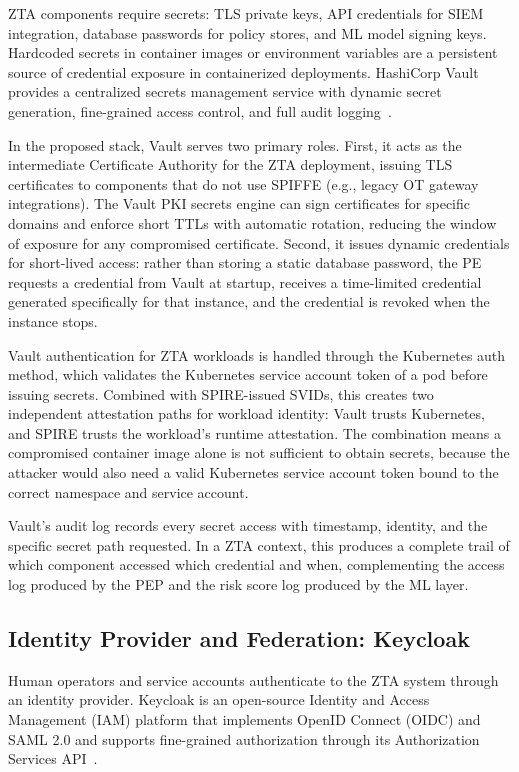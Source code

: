 \documentclass[conference]{IEEEtran}
\begin{document}
ZTA components require secrets: TLS private keys, API credentials for SIEM integration, database passwords for policy stores, and ML model signing keys. Hardcoded secrets in container images or environment variables are a persistent source of credential exposure in containerized deployments. HashiCorp Vault provides a centralized secrets management service with dynamic secret generation, fine-grained access control, and full audit logging~\cite{vault2024}.

In the proposed stack, Vault serves two primary roles. First, it acts as the intermediate Certificate Authority for the ZTA deployment, issuing TLS certificates to components that do not use SPIFFE (e.g., legacy OT gateway integrations). The Vault PKI secrets engine can sign certificates for specific domains and enforce short TTLs with automatic rotation, reducing the window of exposure for any compromised certificate. Second, it issues dynamic credentials for short-lived access: rather than storing a static database password, the PE requests a credential from Vault at startup, receives a time-limited credential generated specifically for that instance, and the credential is revoked when the instance stops.

Vault authentication for ZTA workloads is handled through the Kubernetes auth method, which validates the Kubernetes service account token of a pod before issuing secrets. Combined with SPIRE-issued SVIDs, this creates two independent attestation paths for workload identity: Vault trusts Kubernetes, and SPIRE trusts the workload's runtime attestation. The combination means a compromised container image alone is not sufficient to obtain secrets, because the attacker would also need a valid Kubernetes service account token bound to the correct namespace and service account.

Vault's audit log records every secret access with timestamp, identity, and the specific secret path requested. In a ZTA context, this produces a complete trail of which component accessed which credential and when, complementing the access log produced by the PEP and the risk score log produced by the ML layer.

\subsection{Identity Provider and Federation: Keycloak}

Human operators and service accounts authenticate to the ZTA system through an identity provider. Keycloak is an open-source Identity and Access Management (IAM) platform that implements OpenID Connect (OIDC) and SAML 2.0 and supports fine-grained authorization through its Authorization Services API~\cite{keycloak2024}.
\end{document}
